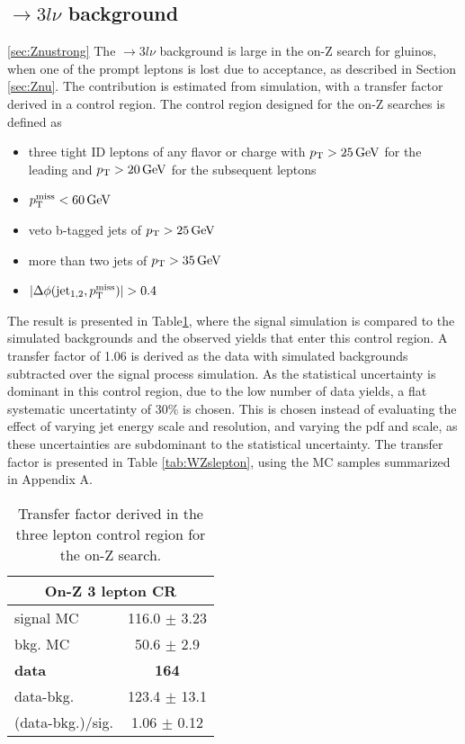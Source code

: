 \subsection*{\PWZ$\rightarrow3l\nu$ background}\ref{sec:Znustrong}
\noindent
\justify
The \PWZ$\rightarrow3l\nu$ background is large in the on-Z search for gluinos, when one of the prompt leptons is lost due to acceptance, as described in Section \ref{sec:Znu}. 
The contribution is estimated from simulation, with a transfer factor derived in a \PWZ control region. 
The \PWZ control region designed for the on-Z searches is defined as
\begin{itemize}
    \item three tight ID leptons of any flavor or charge with $p_{\mathrm{T}}>25\,\text{Ge\hspace{-.08em}V}$ for the leading and $p_{\mathrm{T}}>20\,\text{Ge\hspace{-.08em}V}$ for the subsequent leptons
    \item $p_{\mathrm{T}}^\text{miss}<60\,\text{Ge\hspace{-.08em}V}$
    \item veto b-tagged jets of $p_{\mathrm{T}}>25\,\text{Ge\hspace{-.08em}V}$
    \item more than two jets of $p_{\mathrm{T}}>35\,\text{Ge\hspace{-.08em}V}$
    \item $|\Delta\phi(\mathrm{jet_{1,2}}, \ptmiss)|>0.4$
\end{itemize}
The result is presented in Table\ref{tab:WZonZ}, where the \PWZ signal simulation is compared to the simulated backgrounds and the observed yields that enter this control region.
A transfer factor of 1.06 is derived as the data with simulated backgrounds subtracted over the signal process simulation.
As the statistical uncertainty is dominant in this control region, due to the low number of data yields, a flat systematic uncertatinty of 30\% is chosen.
This is chosen instead of evaluating the effect of varying jet energy scale and resolution, and varying the pdf and scale, as these uncertainties are subdominant to the statistical uncertainty.
The transfer factor is presented in Table \ref{tab:WZslepton}, using the MC samples summarized in Appendix A.
\begin{table}[ht!]
\def\arraystretch{1.2}
\setlength{\belowcaptionskip}{6pt}
\small
\centering
\caption{Transfer factor derived in the three lepton control region for the on-Z search.}
\label{tab:WZonZ}
\begin{tabular}{l c }
\hline \hline
\multicolumn{2}{c}{On-Z 3 lepton CR}  \\\hline
signal MC        & 116.0     $\pm$  3.23    \\
bkg. MC          & 50.6  $\pm$  2.9\\ \hline
\textbf{data}       & \textbf{164}  \\
data-bkg.        &  123.4   $\pm$  13.1 \\ \hline
(data-bkg.)/sig. & 1.06   $\pm$  0.12\\ \hline\hline
\end{tabular}
\end{table}
